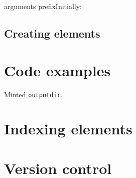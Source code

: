 \documentclass[11pt, outputdir = ./out]{article}
\begin{document}
\begin{Optiondef}{arguments prefix}{}{Initially: \Empty}
\end{Optiondef}

\subsection{Creating elements}


\section{Code examples}

Minted \texttt{outputdir}.


\section{Indexing elements}


\section{Version control}

\printindex
\end{document}
